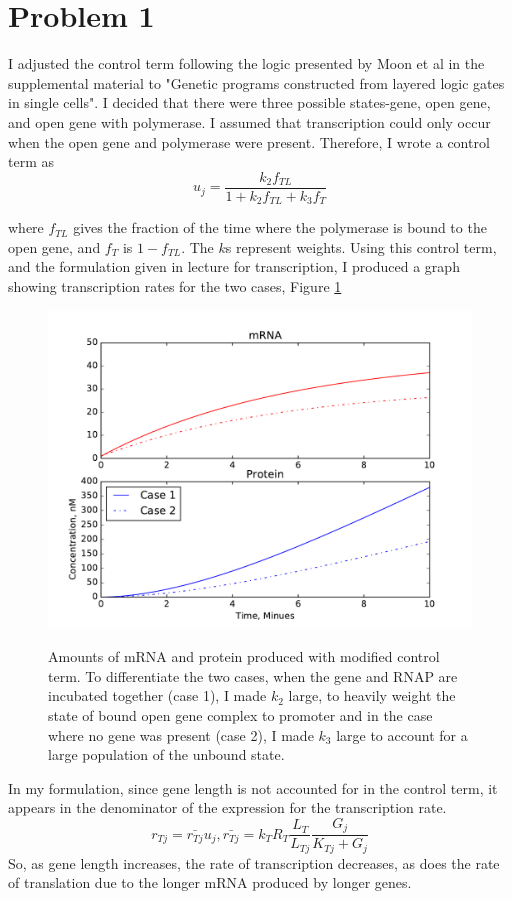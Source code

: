 \documentclass{article}
\begin{document}
 
\section*{Problem 1}
I adjusted the control term following the logic presented by Moon et al in the supplemental material to "Genetic programs constructed from layered logic gates in single cells". I decided that there were three possible states-gene, open gene, and open gene with polymerase. I assumed that transcription could only occur when the open gene and polymerase were present. Therefore, I wrote a control term as
\begin{equation}
u_j = \frac{k_2f_{TL}}{1+k_2f_{TL}+k_3f_T}
\end{equation}

where $f_{TL}$ gives the fraction of the time where the polymerase is bound to the open gene, and $f_T$ is $1-f_{TL}$. The $k$s represent weights. Using this control term, and the formulation given in lecture for transcription, I produced a graph showing transcription rates for the two cases, Figure \ref{fig:P1Transcription}

\begin{figure}[h!]
\includegraphics[width=12cm]{../Problem1/Problem1NotQuiteLinear}
\label{fig:P1Transcription}
\caption{Amounts of mRNA and protein produced with modified control term. To differentiate the two cases, when the gene and RNAP are incubated together (case 1), I made $k_2$ large, to heavily weight the state of bound open gene complex to promoter and in the case where no gene was present (case 2), I made $k_3$ large to account for a large population of the unbound state.}
\end{figure}
In my formulation, since gene length is not accounted for in the control term, it appears in the denominator of the expression for the transcription rate. 
\begin{equation}
r_{Tj} = \bar{r_{Tj}}u_j, 
\bar{r_{Tj}}= k_TR_T\frac{L_T}{L_{Tj}}\frac{G_j}{K_{Tj} + G_j}
\end{equation}
So, as gene length increases, the rate of transcription decreases, as does the rate of translation due to the longer mRNA produced by longer genes. 
 
\end{document}
